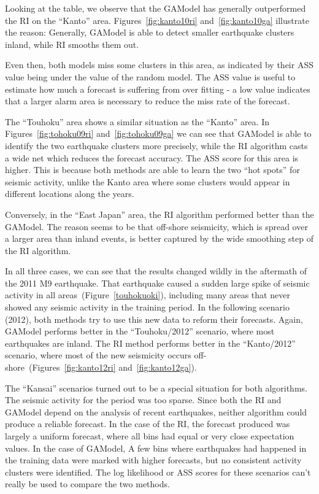 \documentclass[a4paper,twoside]{article}
\begin{document}
Looking at the table, we observe that the GAModel has generally
outperformed the RI on the ``Kanto'' area. Figures~\ref{fig:kanto10ri}
and~\ref{fig:kanto10ga} illustrate the reason: Generally, GAModel is
able to detect smaller earthquake clusters inland, while RI smooths them
out. 

Even then, both models miss some clusters in this area, as indicated
by their ASS value being under the value of the random model. The ASS
value is useful to estimate how much a forecast is suffering from over
fitting - a low value indicates that a larger alarm area is necessary
to reduce the miss rate of the forecast.

The ``Touhoku'' area shows a similar situation as the ``Kanto''
area. In Figures~\ref{fig:tohoku09ri} and~\ref{fig:tohoku09ga} we can
see that GAModel is able to identify the two earthquake clusters more
precisely, while the RI algorithm casts a wide net which reduces the
forecast accuracy. The ASS score for this area is higher. This is
because both methods are able to learn the two ``hot spots'' for
seismic activity, unlike the Kanto area where some clusters would
appear in different locations along the years.

Conversely, in the ``East Japan'' area, the RI algorithm performed
better than the GAModel. The reason seems to be that off-shore
seismicity, which is spread over a larger area than inland events, is
better captured by the wide smoothing step of the RI algorithm.

In all three cases, we can see that the results changed wildly in the
aftermath of the 2011 M9 earthquake. That earthquake caused a sudden
large spike of seismic activity in all
areas~(Figure~\ref{touhokuoki}), including many areas that never
showed any seismic activity in the training period. In the following
scenario (2012), both methods try to use this new data to reform their
forecasts. Again, GAModel performs better in the ``Touhoku/2012''
scenario, where most earthquakes are inland. The RI method performs
better in the ``Kanto/2012'' scenario, where most of the new
seismicity occurs off-shore~(Figures~\ref{fig:kanto12ri}
and~\ref{fig:kanto12ga}).

The ``Kansai'' scenarios turned out to be a special situation for both
algorithms. The seismic activity for the period was too sparse. Since
both the RI and GAModel depend on the analysis of recent earthquakes,
neither algorithm could produce a reliable forecast. In the case of
the RI, the forecast produced was largely a uniform forecast, where
all bins had equal or very close expectation values. In the case of
GAModel, A few bins where earthquakes had happened in the training
data were marked with higher forecasts, but no consistent activity
clusters were identified. The log likelihood or ASS scores for these
scenarios can't really be used to compare the two methods.
\end{document}
